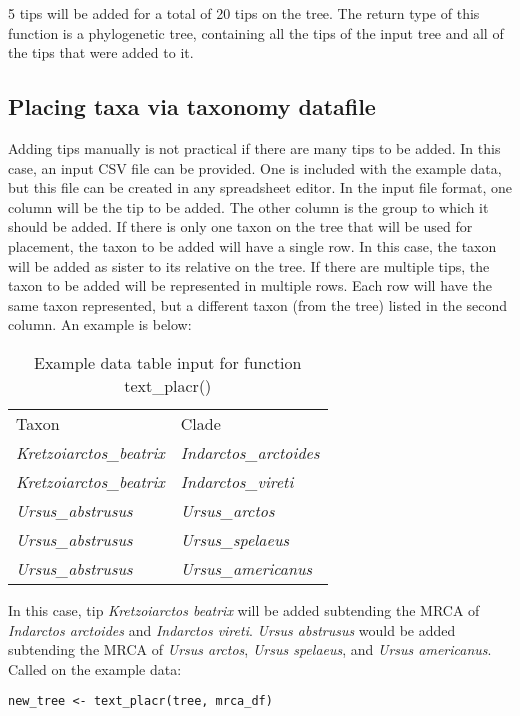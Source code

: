 \documentclass[11pt]{article}
\begin{document}
5 tips will be added for a total of 20 tips on the tree.
The return type of this function is a phylogenetic tree, containing all the tips of the input tree and all of the tips that were added to it.

\subsection{Placing taxa via taxonomy datafile}

Adding tips manually is not practical if there are many tips to be added.
In this case, an input CSV file can be provided.
One is included with the example data, but this file can be created in any spreadsheet editor.
In the input file format, one column will be the tip to be added.
The other column is the group to which it should be added.
If there is only one taxon on the tree that will be used for placement, the taxon to be added will have a single row.
In this case, the taxon will be added as sister to its relative on the tree. 
If there are multiple tips, the taxon to be added will be represented in multiple rows.
Each row will have the same taxon represented, but a different taxon (from the tree) listed in the second column.
An example is below:
\begin{table}
\centering
\begin{tabular}{ll}
Taxon                  & Clade                  \\ \cline{1-2}
\textit{Kretzoiarctos\_beatrix} & \textit{Indarctos\_arctoides}  \\
\textit{Kretzoiarctos\_beatrix} & \textit{Indarctos\_vireti}     \\
\textit{Ursus\_abstrusus}   & \textit{Ursus\_arctos}        \\
\textit{Ursus\_abstrusus}   & \textit{Ursus\_spelaeus}      \\
\textit{Ursus\_abstrusus}   & \textit{Ursus\_americanus}
\end{tabular}
\caption{Example data table input for function text\_placr()}
\end{table}

In this case, tip \textit{Kretzoiarctos beatrix} will be added subtending the MRCA of \textit{Indarctos arctoides} and \textit{Indarctos vireti}.
\textit{Ursus abstrusus} would be added subtending the MRCA of \textit{Ursus arctos}, \textit{Ursus spelaeus}, and \textit{Ursus americanus}. 
Called on the example data: 

{\tt \begin{snugshade*}
\begin{lstlisting}
new_tree <- text_placr(tree, mrca_df)
\end{lstlisting}
\end{snugshade*}}
\end{document}
